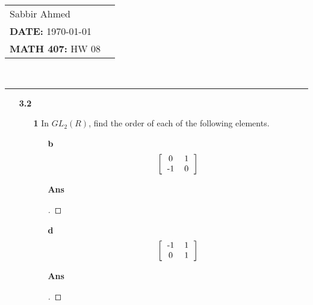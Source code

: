 \documentclass[paper=usletter, fontsize=12pt]{article}
\newcommand{\documentinfo}[5]{
    \begin{centering}
        \parbox{2in}{
        \begin{spacing}{1}
            \begin{flushleft}
                \begin{tabular}{l l}
                    #1 \\
                    #2 \\
                    #3 \\
                \end{tabular}\\
                \rule{\textwidth}{1pt}
            \end{flushleft}
        \end{spacing}
        }
    \end{centering}
}
\begin{document}
    \documentinfo{Sabbir Ahmed}{\textbf{DATE:} \today}{\textbf{MATH 407:} HW 08}
    \vspace{-0.2in}

    \begin{itemize}

        \item[\textbf{3.2}]

        \begin{itemize}

            \item[\textbf{1}] In $GL_2(R)$, find the order of each of the
            following elements.
            \begin{enumerate}

                \item[\textbf{b}]
                \begin{equation*}
                    \left[
                        \begin{tabular}{cc}
                            0 & 1 \\
                            -1 & 0
                        \end{tabular}
                    \right]
                \end{equation*}
                \item[\textbf{Ans}]
                \begin{proof}[\unskip\nopunct]
                \end{proof}
                \vspace{0.2in}

                \item[\textbf{d}]
                \begin{equation*}
                    \left[
                        \begin{tabular}{cc}
                            -1 & 1 \\
                            0 & 1
                        \end{tabular}
                    \right]
                \end{equation*}
                \item[\textbf{Ans}]
                \begin{proof}[\unskip\nopunct]
                \end{proof}
                \vspace{0.2in}

            \end{enumerate}


\end{itemize}
\end{itemize}
\end{document}
